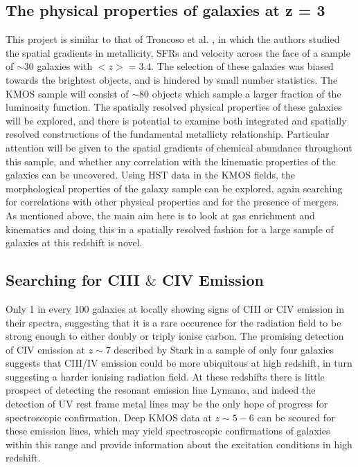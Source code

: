 \documentclass{literature}
\begin{document}
\subsection{The physical properties of galaxies at z = 3}\label{subsec:redshift_three_sample}
This project is similar to that of Troncoso et al. \citep{Troncoso_2014}, in which the authors studied the spatial gradients in metallicity, SFRs and velocity across the face of a sample of $\sim 30$ galaxies with $<z> = 3.4$. The selection of these galaxies was biased towards the brightest objects, and is hindered by small number statistics. The KMOS sample will consist of $\sim 80$ objects which sample a larger fraction of the luminosity function. The spatially resolved physical properties of these galaxies will be explored, and there is potential to examine both integrated and spatially resolved constructions of the fundamental metallicty relationship. Particular attention will be given to the spatial gradients of chemical abundance throughout this sample, and whether any correlation with the kinematic properties of the galaxies can be uncovered. Using HST data in the KMOS fields, the morphological properties of the galaxy sample can be explored, again searching for correlations with other physical properties and for the presence of mergers. \\ 
As mentioned above, the main aim here is to look at gas enrichment and kinematics and doing this in a spatially resolved fashion for a large sample of galaxies at this redshift is novel.     




\subsection{Searching for CIII $\&$ CIV Emission}\label{subsec:CIV_emission}
Only 1 in every 100 galaxies at locally showing signs of CIII or CIV emission in their spectra, suggesting that it is a rare occurence for the radiation field to be strong enough to either doubly or triply ionise carbon. The promising detection of CIV emission at $z \sim 7$ described by Stark \citep{Stark2015} in a sample of only four galaxies suggests that CIII/IV emission could be more ubiquitous at high redshift, in turn suggesting a harder ionising radiation field. At these redshifts there is little prospect of detecting the resonant emission line Lyman$\alpha$, and indeed the detection of UV rest frame metal lines may be the only hope of progress for spectroscopic confirmation. Deep KMOS data at $z\sim 5-6$ can be scoured for these emission lines, which may yield spectroscopic confirmations of galaxies within this range and provide information about the excitation conditions in high redshift. 
\end{document}
